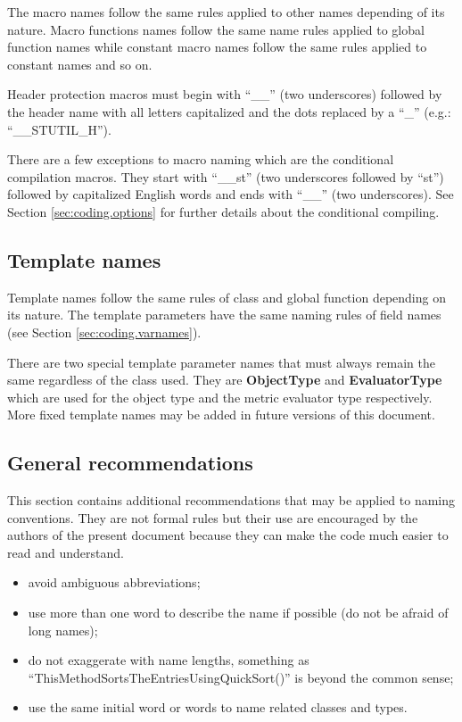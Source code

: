 The macro names follow the same rules applied to other names depending of its nature. Macro functions names follow the same name rules applied to global function names while constant macro names follow the same rules applied to constant names and so on.

Header protection macros must begin with ``\_\_'' (two underscores) followed by the header name with all letters capitalized and the dots replaced by a ``\_'' (e.g.: ``\_\_STUTIL\_H'').

There are a few exceptions to macro naming which are the conditional compilation macros. They start with ``\_\_st'' (two underscores followed by ``st'') followed by capitalized English words and ends with ``\_\_'' (two underscores). See Section \ref{sec:coding.options} for further details about the conditional compiling.

\subsection{Template names}
\label{sec:coding.templatenames}

Template names follow the same rules of class and global function depending on its nature. The template parameters have the same naming rules of field names (see Section \ref{sec:coding.varnames}). 

There are two special template parameter names that must always remain the same regardless of the class used. They are {\bf ObjectType} and {\bf EvaluatorType} which are used for the object type and the metric evaluator type respectively. More fixed template names may be added in future versions of this document.

\subsection{General recommendations}
\label{sec:coding.namingrc}

This section contains additional recommendations that may be applied to naming conventions. They are not formal rules but their use are encouraged by the authors of the present document because they can make the code much easier to read and understand.

\begin{itemize}
	\item avoid ambiguous abbreviations;
	\item use more than one word to describe the name if possible (do not be afraid of long names);
	\item do not exaggerate with name lengths, something as ``ThisMethodSortsTheEntriesUsingQuickSort()'' is beyond the common sense;
	\item use the same initial word or words to name related classes and types.
\end{itemize}


